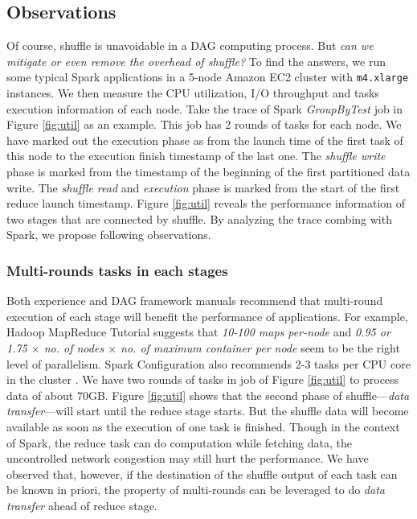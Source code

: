 \subsection{Observations} \label{observation}
Of course, shuffle is unavoidable in a DAG computing process. But \textit{can we mitigate or even remove the overhead of shuffle?} To find the answers, we run some typical Spark applications in a 5-node Amazon EC2 cluster with \texttt{m4.xlarge} instances. We then measure the CPU utilization, I/O throughput and tasks execution information of each node. Take the trace of Spark \textit{GroupByTest} job in Figure \ref{fig:util} as an example. This job has 2 rounds of tasks for each node. We have marked out the execution phase as from the launch time of the first task of this node to the execution finish timestamp of the last one. The \textit{shuffle write} phase is marked from the timestamp of the beginning of the first partitioned data write. The \textit{shuffle read} and \textit{execution} phase is marked from the start of the first reduce launch timestamp.
Figure \ref{fig:util} reveals the performance information of two stages that are connected by shuffle. By analyzing the trace combing with Spark, we propose following observations.


\subsubsection{Multi-rounds tasks in each stages}\label{multi}
Both experience and DAG framework manuals recommend that multi-round execution of each stage will benefit the performance of applications.
For example, Hadoop MapReduce Tutorial \cite{hadooptutorial} suggests that \textit{10-100 maps per-node} and \textit{0.95 or 1.75 $\times$ no. of nodes $\times$ no. of maximum container per node} seem to be the right level of parallelism. Spark Configuration also recommends 2-3 tasks per CPU core in the cluster \cite{sparkconf}.
We have two rounds of tasks in job of Figure \ref{fig:util} to process data of about $70$GB. Figure \ref{fig:util} shows that the second phase of shuffle---\textit{data transfer}---will start until the reduce stage starts.
But the shuffle data will become available as soon as the execution of one task is finished. Though in the context of Spark, the reduce task can do computation while fetching data, the uncontrolled network congestion may still hurt the performance. We have observed that, however, if the destination of the shuffle output of each task can be known in priori, the property of multi-rounds can be leveraged to do \textit{data transfer} ahead of reduce stage.

